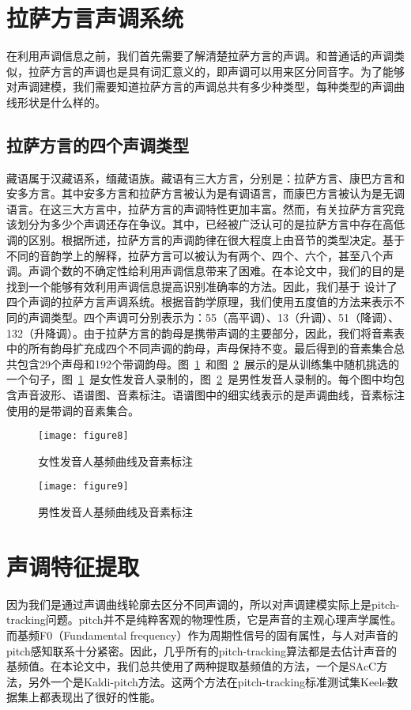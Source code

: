 \section{拉萨方言声调系统}
在利用声调信息之前，我们首先需要了解清楚拉萨方言的声调。和普通话的声调类似，拉萨方言的声调也是具有词汇意义的，即声调可以用来区分同音字。为了能够对声调建模，我们需要知道拉萨方言的声调总共有多少种类型，每种类型的声调曲线形状是什么样的。
\subsection{拉萨方言的四个声调类型}
藏语属于汉藏语系，缅藏语族。藏语有三大方言，分别是：拉萨方言、康巴方言和安多方言。其中安多方言和拉萨方言被认为是有调语言，而康巴方言被认为是无调语言。在这三大方言中，拉萨方言的声调特性更加丰富。然而，有关拉萨方言究竟该划分为多少个声调还存在争议。其中，已经被广泛认可的是拉萨方言中存在高低调的区别。根据\cite{hu2010lhasa}所述，拉萨方言的声调韵律在很大程度上由音节的类型决定。基于不同的音韵学上的解释，拉萨方言可以被认为有两个、四个、六个，甚至八个声调。声调个数的不确定性给利用声调信息带来了困难。在本论文中，我们的目的是找到一个能够有效利用声调信息提高识别准确率的方法。因此，我们基于\cite{Yudaoquan} 设计了四个声调的拉萨方言声调系统。根据音韵学原理，我们使用五度值的方法\cite{chao1980system}来表示不同的声调类型。四个声调可分别表示为：55（高平调）、13（升调）、51（降调）、132（升降调）。由于拉萨方言的韵母是携带声调的主要部分，因此，我们将音素表中的所有韵母扩充成四个不同声调的韵母，声母保持不变。最后得到的音素集合总共包含29个声母和192个带调韵母。图~\ref{fig:figure8}~和图~\ref{fig:figure9}~展示的是从训练集中随机挑选的一个句子，图~\ref{fig:figure8}~是女性发音人录制的，图~\ref{fig:figure9}~是男性发音人录制的。每个图中均包含声音波形、语谱图、音素标注。语谱图中的细实线表示的是声调曲线，音素标注使用的是带调的音素集合。
\begin{figure}[htbp]
\centering
\texttt{[image: figure8]}
\caption{女性发音人基频曲线及音素标注}\label{fig:figure8}
\vspace{\baselineskip}
\end{figure}

\begin{figure}[htbp]
\centering
\texttt{[image: figure9]}
\caption{男性发音人基频曲线及音素标注}\label{fig:figure9}
\vspace{\baselineskip}
\end{figure}

\section{声调特征提取}
因为我们是通过声调曲线轮廓去区分不同声调的，所以对声调建模实际上是pitch-tracking问题。pitch并不是纯粹客观的物理性质，它是声音的主观心理声学属性。而基频F0（Fundamental frequency）作为周期性信号的固有属性，与人对声音的pitch感知联系十分紧密。因此，几乎所有的pitch-tracking算法都是去估计声音的基频值\cite{kleijn1995robust}。在本论文中，我们总共使用了两种提取基频值的方法，一个是SAcC方法\cite{lee2012noise}，另外一个是Kaldi-pitch方法\cite{ghahremani2014pitch}。这两个方法在pitch-tracking标准测试集Keele数据集\cite{plante1995pitch}上都表现出了很好的性能。
